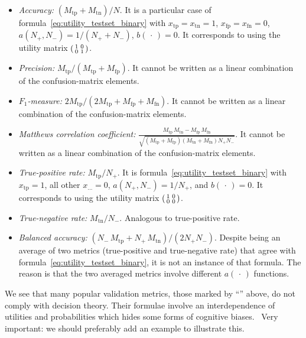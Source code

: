 \documentclass[\ifafour a4paper,12pt,\else a5paper,10pt,\fi%
onecolumn,oneside,article,%
british%
]{memoir}
\theoremstyle{remark}
\theoremstyle{innote}
\newcommand*{\dotv}{\mathord{\,\cdot\,}}%
\renewcommand*{\|}[1][]{\nonscript\:#1\vert\nonscript\:\mathopen{}}
\newcommand*{\wrench}{{\fontencoding{U}\fontfamily{fontawesomethree}\selectfont\symbol{114}}}
\newcommand{\mynote}[1]{ {\color{notecolour}#1}}
\newcommand*{\Po}{\mathord{+}}
\newcommand*{\Ne}{\mathord{-}}
\newcommand*{\tp}{\textrm{tp}}
\newcommand*{\fp}{\textrm{fp}}
\newcommand*{\fn}{\textrm{fn}}
\newcommand*{\tn}{\textrm{tn}}
\newcommand*{\itemyes}{{\fontencoding{U}\fontfamily{pzd}\selectfont\symbol{51}}}
\newcommand*{\itemno}{{\fontencoding{U}\fontfamily{pzd}\selectfont\symbol{55}}}
\begin{document}
\begin{itemize}
\item[\itemyes] \emph{Accuracy:} $(M_{\tp}+M_{\tn})/N$. It is a particular case of formula~\eqref{eq:utility_testset_binary} with $x_{\tp}=x_{\tn}=1$,\; $x_{\fp}=x_{\fn}=0$,\; $a(N_{\Po},N_{\Ne})=1/(N_{\Po}+N_{\Ne})$,\; $b(\dotv)=0$. It corresponds to using the utility matrix $\begin{psmallmatrix} 1&0\\0&1 \end{psmallmatrix}$.
  
\item[\itemno] \emph{Precision:} $M_{\tp}/(M_{\tp}+M_{\fp})$. It cannot be written as a linear combination of the confusion-matrix elements.

\item[\itemno] \emph{$F_{1}$-measure:} $2 M_{\tp}/(2M_{\tp} + M_{\fp} + M_{\fn})$. It cannot be written as a linear combination of the confusion-matrix elements.

\item[\itemno] \emph{Matthews correlation coefficient:} $\frac{M_{\tp}\, M_{\tn} - M_{\fp}\, M_{\fn}}{\sqrt{(M_{\tp}+M_{\fp})(M_{\tn}+M_{\fn})N_{\Po}N_{\Ne}}}$. It cannot be written as a linear combination of the confusion-matrix elements.

\item[\itemyes] \emph{True-positive rate:} $M_{\tp}/N_{\Po}$. It is  formula~\eqref{eq:utility_testset_binary} with $x_{\tp}=1$, all other $x_{\dotso}=0$, $a(N_{\Po},N_{\Ne})=1/N_{\Po}$, and $b(\dotv)=0$. It corresponds to using the utility matrix $\begin{psmallmatrix} 1&0\\0&0 \end{psmallmatrix}$. 

\item[\itemyes] \emph{True-negative rate:} $M_{\tn}/N_{\Ne}$. Analogous to true-positive rate.

\item[\itemno] \emph{Balanced accuracy:} $(N_{\Ne}\,M_{\tp} + N_{\Po}\, M_{\tn})/(2 N_{\Po}N_{\Ne})$. Despite being an average of two metrics (true-positive and true-negative rate) that agree with formula~\eqref{eq:utility_testset_binary}, it is not an instance of that formula. The reason is that the two averaged metrics involve different $a(\dotv)$ functions.
\end{itemize}

We see that many popular validation metrics, those marked by \enquote{\itemno} above, do not comply with decision theory. Their formulae involve an interdependence of utilities and probabilities which hides some forms of cognitive biases.
\mynote{\wrench\ Very important: we should preferably add an example to illustrate this.}
\end{document}
